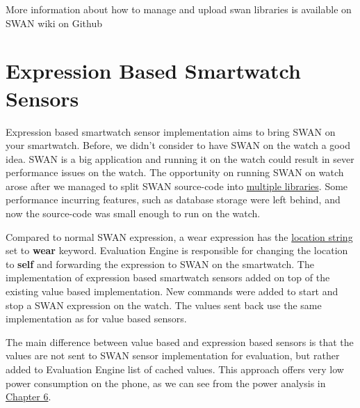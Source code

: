 More information about how to manage and upload swan libraries is available on SWAN wiki on Github\cite{swanWiki}


\section{Expression  Based  Smartwatch Sensors }

Expression based smartwatch sensor implementation aims to bring SWAN on your smartwatch. Before, we didn't consider to have SWAN on the watch a good idea. SWAN is a big application and running
it on the watch could result in sever performance issues on the watch. The opportunity on running SWAN on watch arose after we managed to split SWAN source-code into \hyperref[scc:swan_split]{multiple libraries}. 
Some performance incurring features, such as database storage were left behind, and now the source-code was small enough to run on the watch.

Compared to normal SWAN expression, a wear expression has the \hyperref[fig:SwanExpression]{location string} set to \textbf{wear} keyword. Evaluation Engine is responsible for changing the location
to \textbf{self} and forwarding the expression to SWAN on the smartwatch.
The implementation of expression based smartwatch sensors added on top of the existing value based implementation. New commands were added to start and stop a SWAN expression on the watch.
The values sent back use the same implementation as for value based sensors. 

The main difference between value based and expression based sensors is that the values are not sent to SWAN sensor implementation for evaluation, but rather added to Evaluation Engine list of cached
values. This approach offers very low power consumption on the phone, as we can see from the power analysis in \hyperref[Chapter6]{Chapter 6}.
